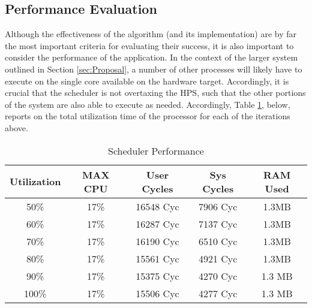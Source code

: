 \subsection{Performance Evaluation}\label{performanceData}
Although the effectiveness of the algorithm (and its implementation) are by far the most important criteria for evaluating their success, it is also important to consider the performance of the application. In the context of the larger system outlined in Section \ref{sec:Proposal}, a number of other processes will likely have to execute on the single core available on the hardware target. Accordingly, it is crucial that the scheduler is not overtaxing the HPS, such that the other portions of the system are also able to execute as needed. Accordingly, Table \ref{table:2}, below, reports on the total utilization time of the processor for each of the iterations above.

\begin{table}[h!]
    \centering\begin{tabular}{| c | c | c | c | c |}
        \hline
        Utilization & MAX CPU & User Cycles & Sys Cycles & RAM Used \\
        \hline
        50\% & 17\% & 16548 Cyc & 7906 Cyc & 1.3MB \\
        60\% & 17\% & 16287 Cyc & 7137 Cyc & 1.3MB \\
        70\% & 17\% & 16190 Cyc & 6510 Cyc & 1.3MB \\
        80\% & 17\% & 15561 Cyc & 4921 Cyc & 1.3MB \\
        90\% & 17\% & 15375 Cyc & 4270 Cyc & 1.3 MB \\
        100\% & 17\% & 15506 Cyc & 4277 Cyc & 1.3 MB \\
        \hline
    \end{tabular}
    \caption{Scheduler Performance}
    \label{table:2}
\end{table}
